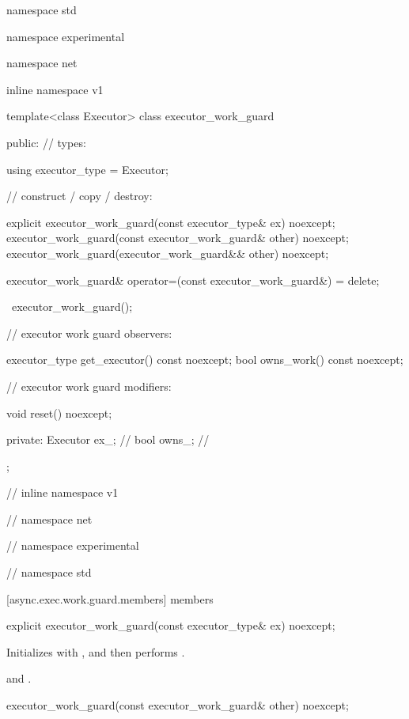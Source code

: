 %
\begin{codeblock}
namespace std {
namespace experimental {
namespace net {
inline namespace v1 {

  template<class Executor>
  class executor_work_guard
  {
  public:
    // types:

    using executor_type = Executor;

    // construct / copy / destroy:

    explicit executor_work_guard(const executor_type& ex) noexcept;
    executor_work_guard(const executor_work_guard& other) noexcept;
    executor_work_guard(executor_work_guard&& other) noexcept;

    executor_work_guard& operator=(const executor_work_guard&) = delete;

    ~executor_work_guard();

    // executor work guard observers:

    executor_type get_executor() const noexcept;
    bool owns_work() const noexcept;

    // executor work guard modifiers:

    void reset() noexcept;

  private:
    Executor ex_; // \expos
    bool owns_; // \expos
  };

} // inline namespace v1
} // namespace net
} // namespace experimental
} // namespace std
\end{codeblock}


[async.exec.work.guard.members]{ members}

%
\begin{itemdecl}
explicit executor_work_guard(const executor_type& ex) noexcept;
\end{itemdecl}

\begin{itemdescr}
\pnum
\effects Initializes  with , and then performs .

\pnum
\postconditions {} and .
\end{itemdescr}

%
\begin{itemdecl}
executor_work_guard(const executor_work_guard& other) noexcept;
\end{itemdecl}

